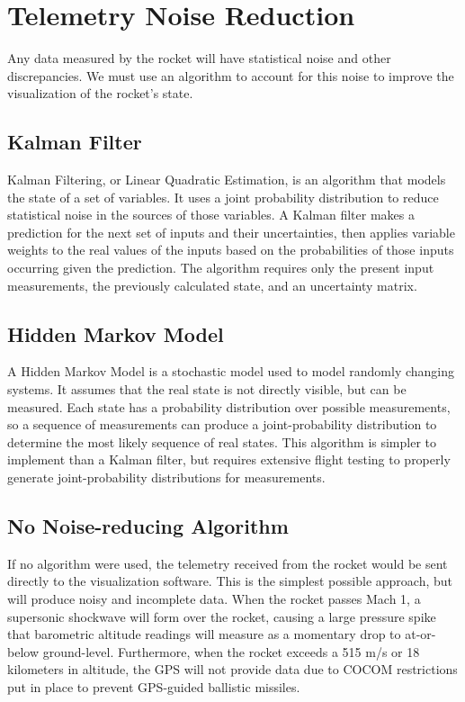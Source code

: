 \documentclass[onecolumn, draftclsnofoot,10pt, compsoc]{IEEEtran}
\begin{document}
	\section{Telemetry Noise Reduction}
		\noindent
		Any data measured by the rocket will have statistical noise and other discrepancies.
		We must use an algorithm to account for this noise to improve the visualization of the rocket's state.
		
		\subsection{Kalman Filter}
			\noindent
			Kalman Filtering\cite{Kalman-Filter}, or Linear Quadratic Estimation, is an algorithm that models the state of a set of variables.
			It uses a joint probability distribution to reduce statistical noise in the sources of those variables.
			A Kalman filter makes a prediction for the next set of inputs and their uncertainties, then applies variable weights to the real values of the inputs based on the probabilities of those inputs occurring given the prediction.
			The algorithm requires only the present input measurements, the previously calculated state, and an uncertainty matrix.
			
		\subsection{Hidden Markov Model}
			\noindent
			A Hidden Markov Model is a stochastic model used to model randomly changing systems.
			It assumes that the real state is not directly visible, but can be measured.
			Each state has a probability distribution over possible measurements, so a sequence of measurements can produce a joint-probability distribution to determine the most likely sequence of real states.
			This algorithm is simpler to implement than a Kalman filter, but requires extensive flight testing to properly generate joint-probability distributions for measurements.
	
		\subsection{No Noise-reducing Algorithm}
			\noindent
			If no algorithm were used, the telemetry received from the rocket would be sent directly to the visualization software.
			This is the simplest possible approach, but will produce noisy and incomplete data.
			When the rocket passes Mach 1, a supersonic shockwave will form over the rocket, causing a large pressure spike that barometric altitude readings will measure as a momentary drop to at-or-below ground-level.
			Furthermore, when the rocket exceeds a 515 m/s or 18 kilometers in altitude\cite{COCOM}, the GPS will not provide data due to COCOM restrictions put in place to prevent GPS-guided ballistic missiles.
		
\end{document}
